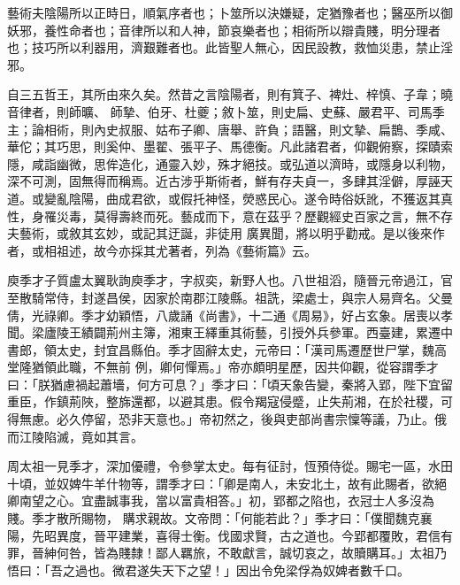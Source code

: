
\begin{pinyinscope}

 藝術夫陰陽所以正時日，順氣序者也；卜筮所以決嫌疑，定猶豫者也；醫巫所以御妖邪，養性命者也；音律所以和人神，節哀樂者也；相術所以辯貴賤，明分理者也；技巧所以利器用，濟艱難者也。此皆聖人無心，因民設教，救恤災患，禁止淫邪。



 自三五哲王，其所由來久矣。然昔之言陰陽者，則有箕子、裨灶、梓慎、子韋；曉音律者，則師曠、
 師摯、伯牙、杜夔；敘卜筮，則史扁、史蘇、嚴君平、司馬季主；論相術，則內史叔服、姑布子卿、唐舉、許負；語醫，則文摯、扁鵲、季咸、華佗；其巧思，則奚仲、墨翟、張平子、馬德衡。凡此諸君者，仰觀俯察，探賾索隱，咸詣幽微，思侔造化，通靈入妙，殊才絕技。或弘道以濟時，或隱身以利物，深不可測，固無得而稱焉。近古涉乎斯術者，鮮有存夫貞一，多肆其淫僻，厚誣天道。或變亂陰陽，曲成君欲，或假托神怪，熒惑民心。遂令時俗妖訛，不獲返其真性，身罹災毒，莫得壽終而死。藝成而下，意在茲乎？歷觀經史百家之言，無不存夫藝術，或敘其玄妙，或記其迂誕，非徒用
 廣異聞，將以明乎勸戒。是以後來作者，或相祖述，故今亦採其尤著者，列為《藝術篇》云。



 庾季才子質盧太翼耿詢庾季才，字叔奕，新野人也。八世祖滔，隨晉元帝過江，官至散騎常侍，封遂昌侯，因家於南郡江陵縣。祖詵，梁處士，與宗人易齊名。父曼倩，光祿卿。季才幼穎悟，八歲誦《尚書》，十二通《周易》，好占玄象。居喪以孝聞。梁廬陵王績闢荊州主簿，湘東王繹重其術藝，引授外兵參軍。西臺建，累遷中書郎，領太史，封宜昌縣伯。季才固辭太史，元帝曰：「漢司馬遷歷世尸掌，魏高堂隆猶領此職，不無前
 例，卿何憚焉。」帝亦頗明星歷，因共仰觀，從容謂季才曰：「朕猶慮禍起蕭墻，何方可息？」季才曰：「頃天象告變，秦將入郢，陛下宜留重臣，作鎮荊陜，整旆還都，以避其患。假令羯寇侵蹙，止失荊湘，在於社稷，可得無慮。必久停留，恐非天意也。」帝初然之，後與吏部尚書宗懍等議，乃止。俄而江陵陷滅，竟如其言。



 周太祖一見季才，深加優禮，令參掌太史。每有征討，恆預侍從。賜宅一區，水田十頃，並奴婢牛羊什物等，謂季才曰：「卿是南人，未安北土，故有此賜者，欲絕卿南望之心。宜盡誠事我，當以富貴相答。」初，郢都之陷也，衣冠士人多沒為賤。季才散所賜物，
 購求親故。文帝問：「何能若此？」季才曰：「僕聞魏克襄陽，先昭異度，晉平建業，喜得士衡。伐國求賢，古之道也。今郢都覆敗，君信有罪，晉紳何咎，皆為賤隸！鄙人羈旅，不敢獻言，誠切哀之，故贖購耳。」太祖乃悟曰：「吾之過也。微君遂失天下之望！」因出令免梁俘為奴婢者數千口。




\end{pinyinscope}

